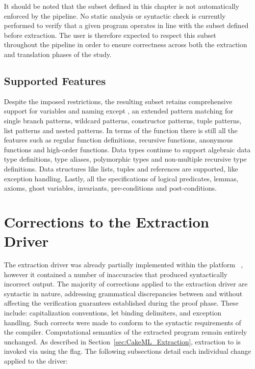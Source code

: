 It should be noted that the subset defined in this chapter is not automatically enforced by the pipeline. No static analysis or syntactic check is currently performed to verify 
that a given \whyml program operates in line with the subset defined before extraction. The user is therefore expected to respect this subset throughout the pipeline in order 
to ensure correctness across both the extraction and translation phases of the study.

\subsection{Supported Features}

Despite the imposed restrictions, the resulting subset retains comprehensive support for variables and naming except ,
an extended pattern matching for single branch patterns, wildcard patterns, constructor patterns, tuple patterns, list
patterns and nested patterns. In terms of the function there is still all the \whyml features such as regular function definitions,
recursive functions, anonymous functions and high-order functions. Data types continue to support algebraic data type definitions,
type aliases, polymorphic types and non-multiple recursive type definitions. Data structures like lists, tuples and references are supported,
like exception handling. Lastly, all the specifications of logical predicates, lemmas, axioms, ghost variables, invariants, pre-conditions and
post-conditions.

\section{Corrections to the \cml Extraction Driver}
\label{sec:Corrections_Cakeml}

The \cml extraction driver was already partially implemented within the \whythree platform ~\cite{PereiraR20,ChargueraudFLP19}, however it contained a number of inaccuracies that produced syntactically incorrect 
\cml output. The majority of corrections applied to the \cml extraction driver are syntactic in nature, addressing grammatical discrepancies between \whyml and \cml without
affecting the verification guarantees established during the proof phase. These include: capitalization conventions, let binding delimiters, and exception handling. Such
corrects were made to conform to the syntactic requirements of the \cml compiler. Computational semantics of the extracted program remain entirely unchanged. As described
in Section~\ref{sec:CakeML_Extraction}, extraction to \cml is invoked via \cameleer using the  flag. The following subsections detail each individual
change applied to the driver:

